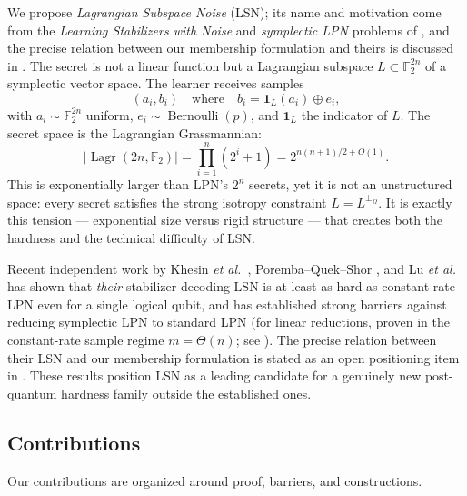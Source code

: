 \documentclass[11pt,a4paper]{article}
\theoremstyle{plain}
\theoremstyle{definition}
\newcommand{\F}{\mathbb{F}}
\DeclareMathOperator{\Lagr}{Lagr}
\newcommand{\etal}{\textit{et al.}}
\begin{document}
We propose \emph{Lagrangian Subspace Noise} (LSN); its name and motivation come from the \emph{Learning Stabilizers with Noise} and \emph{symplectic LPN} problems of \cite{KLP+25,LPQR26}, and the precise relation between our membership formulation and theirs is discussed in . The secret is not a linear function but a Lagrangian subspace $L \subset \F_2^{2n}$ of a symplectic vector space. The learner receives samples
\[
(a_i, b_i) \quad \text{where} \quad b_i = \mathbf{1}_L(a_i) \oplus e_i,
\]
with $a_i \sim \F_2^{2n}$ uniform, $e_i \sim \operatorname{Bernoulli}(p)$, and $\mathbf{1}_L$ the indicator of $L$. The secret space is the Lagrangian Grassmannian:
\begin{equation}
\label{eq:lagr-count}
|\Lagr(2n, \F_2)| = \prod_{i=1}^n (2^i + 1) = 2^{n(n+1)/2 + O(1)}.
\end{equation}
This is exponentially larger than LPN's $2^n$ secrets, yet it is not an unstructured space: every secret satisfies the strong isotropy constraint $L = L^{\perp_\Omega}$. It is exactly this tension --- exponential size versus rigid structure --- that creates both the hardness and the technical difficulty of LSN.

Recent independent work by Khesin \etal\ \cite{KLP+25}, Poremba--Quek--Shor \cite{PQS26}, and Lu \etal\ \cite{LPQR26} has shown that \emph{their} stabilizer-decoding LSN is at least as hard as constant-rate LPN even for a single logical qubit, and has established strong barriers against reducing symplectic LPN to standard LPN (for linear reductions, proven in the constant-rate sample regime $m=\Theta(n)$; see ). The precise relation between their LSN and our membership formulation is stated as an open positioning item in . These results position LSN as a leading candidate for a genuinely new post-quantum hardness family outside the established ones.

\subsection{Contributions}
\label{subsec:contributions}

Our contributions are organized around proof, barriers, and constructions.
\end{document}
